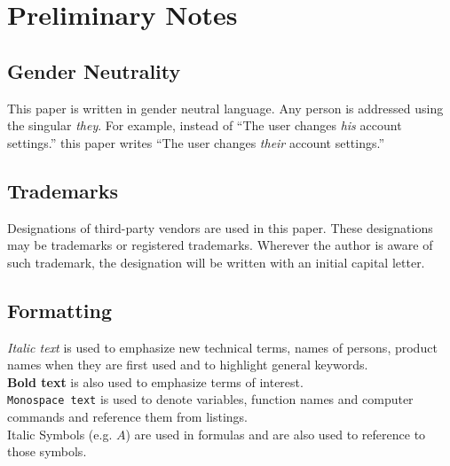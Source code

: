 \clearpage
\chapter*{Preliminary Notes}
\label{chap:prenotes}
\thispagestyle{scrheadings}

\section*{Gender Neutrality}
This paper is written in gender neutral language.
Any person is addressed using the singular \emph{they}.
For example, instead of
``The user changes \emph{his} account settings.''
this paper writes
``The user changes \emph{their} account settings.''


\section*{Trademarks}
Designations of third-party vendors are used in this paper.
These designations may be trademarks or registered trademarks.
Wherever the author is aware of such trademark,
the designation will be written with an initial capital letter.

\section*{Formatting}
\emph{Italic text} is used to emphasize new technical terms, names of persons, product names when they are first used and to highlight general keywords.\\ 
\textbf{Bold text} is also used to emphasize terms of interest. \\ 
\texttt{Monospace text} is used to denote variables,  function names and computer commands and reference them from listings.\\
Italic Symbols (e.g. $A$) are used in formulas and are also used to reference to those symbols.
